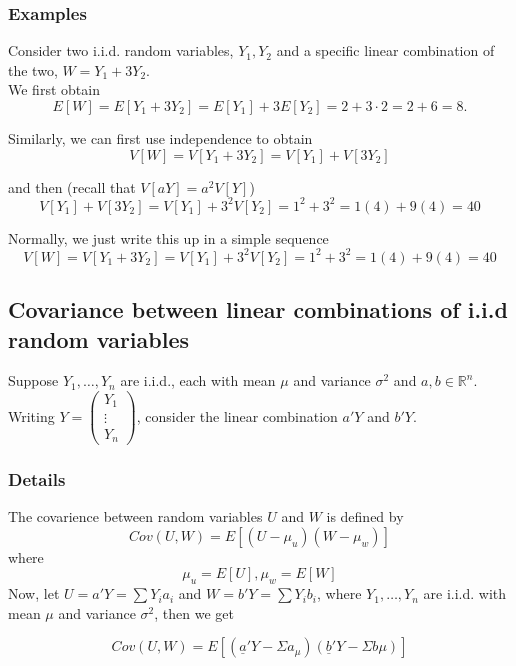 \documentclass[12pt,a4paper]{article}
\theoremstyle{regla}
\theoremstyle{remark}
\theoremstyle{definition}
\theoremstyle{nonumberbreak}
\begin{document}
\subsubsection{Examples}
\begin{xmpl} 
Consider two i.i.d. random variables, 
$Y_1,Y_2$ 
and a specific  
linear combination of the two, 
$W=Y_1+3Y_2$.\\

We first obtain 
$$E[W]=E[Y_1+3Y_2]=E[Y_1]+3E[Y_2]=2+3\cdot 2=2+6=8.$$

Similarly, we 
can first use independence 
to obtain
$$V[W]=V[Y_1+3Y_2]=V[Y_1]+V[3Y_2]$$

and then (recall that $V[aY]=a^2V[Y]$)
$$V[Y_1]+V[3Y_2]=V[Y_1]+3^2V[Y_2]=1^2+3^2= 1(4) + 9(4)= 40$$

Normally, 
we just write this up in 
a simple sequence
$$V[W]=V[Y_1+3Y_2]=V[Y_1]+3^2V[Y_2]=1^2+3^2= 1(4) + 9(4)= 40$$
\end{xmpl}

\subsection{Covariance between linear combinations of i.i.d random variables}
\begin{fbox}
\begin{minipage}{0.97\textwidth}
Suppose $Y_1,\ldots,Y_n$ are i.i.d., each with mean $\mu$ and variance $\sigma^2$ and $a,b\in \mathbb{R}^n$.
Writing 
$
 Y= \left(
 \begin{array}{ccc}
   Y_1  \\
   \vdots\\
   Y_n 
 \end{array} \right)
$, consider the linear combination $a'Y$ and $b'Y$.
\end{minipage}
\end{fbox}
\subsubsection{Details}
The covarience between random variables $U$ and $W$ is defined by\\
$$Cov(U,W)= E[(U-\mu_u)(W-\mu_w)]$$
where 
$$\mu_u=E[U],\mu_w=E[W]$$
Now, let $U=a'Y=\sum Y_ia_i$ and $W=b'Y=\sum Y_ib_i$, where $Y_1,\ldots,Y_n$ are i.i.d. with mean $\mu$ and variance $\sigma^2$, then we get

$$Cov(U,W)= E[(\underline{a}'Y-\Sigma a_\mu)(\underline{b}'Y-\Sigma b\mu)]$$
\end{document}
